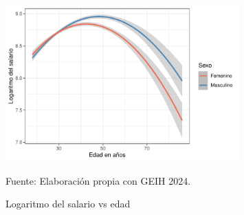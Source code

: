         \begin{figure}[H]
            \caption{Logaritmo del salario vs edad}
            \centering
            \includegraphics[width=0.8\textwidth]{imagenes/predict_by_zex.pdf}
             \label{fig:scatter1}
            \begin{minipage}{7\textwidth}
            \footnotesize
            \hspace{2cm} Fuente: Elaboración propia con GEIH 2024.
       
            \end{minipage}
        \end{figure}